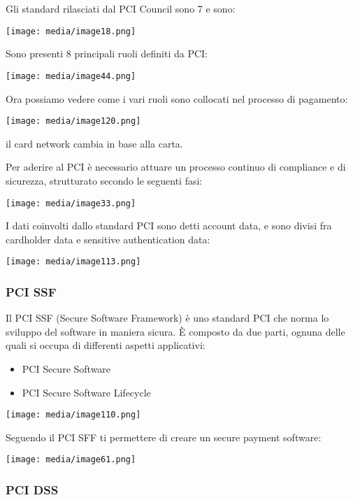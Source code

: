 Gli standard rilasciati dal PCI Council sono 7 e sono:

\texttt{[image: media/image18.png]}

Sono presenti 8 principali ruoli definiti da PCI:

\texttt{[image: media/image44.png]}

Ora possiamo vedere come i vari ruoli sono collocati nel processo di
pagamento:

\texttt{[image: media/image120.png]}

il card network cambia in base alla carta.

Per aderire al PCI è necessario attuare un processo continuo di
compliance e di sicurezza, strutturato secondo le seguenti fasi:

\texttt{[image: media/image33.png]}

I dati coinvolti dallo standard PCI sono detti account data, e sono
divisi fra cardholder data e sensitive authentication data:

\texttt{[image: media/image113.png]}

\subsubsection{PCI SSF}\label{pci-ssf}

Il PCI SSF (Secure Software Framework) è uno standard PCI che norma lo
sviluppo del software in maniera sicura. È composto da due parti, ognuna
delle quali si occupa di differenti aspetti applicativi:

\begin{itemize}
\item
  PCI Secure Software
\item
  PCI Secure Software Lifecycle
\end{itemize}

\texttt{[image: media/image110.png]}

Seguendo il PCI SFF ti permettere di creare un secure payment software:

\texttt{[image: media/image61.png]}

\subsubsection{PCI DSS}\label{pci-dss}


